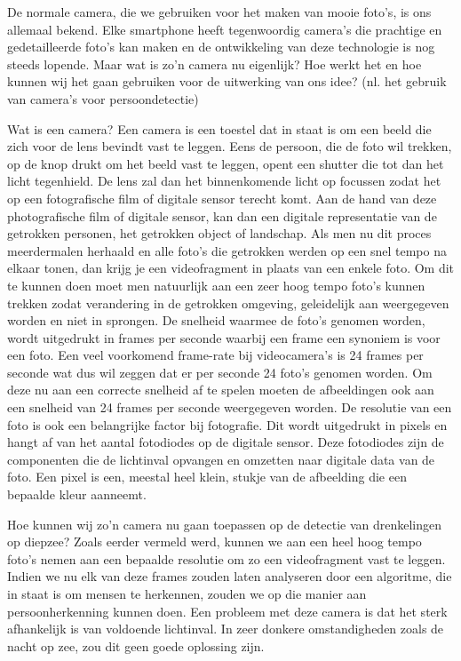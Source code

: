 \subitem
De normale camera, die we gebruiken voor het maken van mooie foto's, is ons allemaal bekend. Elke smartphone heeft tegenwoordig camera's die prachtige en gedetailleerde foto's kan maken en de ontwikkeling van deze technologie is nog steeds lopende. Maar wat is zo'n camera nu eigenlijk? Hoe werkt het en hoe kunnen wij het gaan gebruiken voor de uitwerking van ons idee? (nl. het gebruik van camera's voor persoondetectie)

\subitem
Wat is een camera? Een camera is een toestel dat in staat is om een beeld die zich voor de lens bevindt vast te leggen. Eens de persoon, die de foto wil trekken, op de knop drukt om het beeld vast te leggen, opent een shutter die tot dan het licht tegenhield. De lens zal dan het binnenkomende licht op focussen zodat het op een fotografische film of digitale sensor terecht komt. Aan de hand van deze photografische film of digitale sensor, kan dan een digitale representatie van de getrokken personen, het getrokken object of landschap. Als men nu dit proces meerdermalen herhaald en alle foto's die getrokken werden op een snel tempo na elkaar tonen, dan krijg je een videofragment in plaats van een enkele foto. Om dit te kunnen doen moet men natuurlijk aan een zeer hoog tempo foto's kunnen trekken zodat verandering in de getrokken omgeving, geleidelijk aan weergegeven worden en niet in sprongen. De snelheid waarmee de foto's genomen worden, wordt uitgedrukt in frames per seconde waarbij een frame een synoniem is voor een foto. Een veel voorkomend frame-rate bij videocamera's is 24 frames per seconde wat dus wil zeggen dat er per seconde 24 foto's genomen worden. Om deze nu aan een correcte snelheid af te spelen moeten de afbeeldingen ook aan een snelheid van 24 frames per seconde weergegeven worden. De resolutie van een foto is ook een belangrijke factor bij fotografie. Dit wordt uitgedrukt in pixels en hangt af van het aantal fotodiodes op de digitale sensor. Deze fotodiodes zijn de componenten die de lichtinval opvangen en omzetten naar digitale data van de foto. Een pixel is een, meestal heel klein, stukje van de afbeelding die een bepaalde kleur aanneemt. \autocite{DigitalCameras}

\subitem
Hoe kunnen wij zo'n camera nu gaan toepassen op de detectie van drenkelingen op diepzee? Zoals eerder vermeld werd, kunnen we aan een heel hoog tempo foto's nemen aan een bepaalde resolutie om zo een videofragment vast te leggen. Indien we nu elk van deze frames zouden laten analyseren door een algoritme, die in staat is om mensen te herkennen, zouden we op die manier aan persoonherkenning kunnen doen. Een probleem met deze camera is dat het sterk afhankelijk is van voldoende lichtinval. In zeer donkere omstandigheden zoals de nacht op zee, zou dit geen goede oplossing zijn. 


